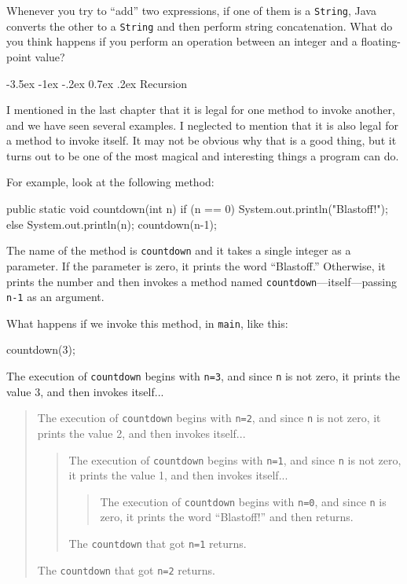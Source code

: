 \documentclass{book}
\makeatletter
\renewcommand{\section}{\@startsection 
    {section} {1} {0mm}%
    {-3.5ex \@plus -1ex \@minus -.2ex}%
    {0.7ex \@plus.2ex}%
    {\normalfont\Large\bfseries}}
\makeatother
\begin{document}
Whenever you try to ``add'' two
expressions, if one of them is a {\tt String}, Java converts the
other to a {\tt String} and then perform string concatenation.  What do you
think happens if you perform an operation between an integer and a
floating-point value?


\section{Recursion}
\label{recursion}

I mentioned in the last chapter that it is legal for one method to
invoke another, and we have seen several examples.  I neglected to
mention that it is also legal for a method to invoke itself.  It may
not be obvious why that is a good thing, but it turns out to be one of
the most magical and interesting things a program can do.

For example, look at the following method:

\begin{verbatimtab}
  public static void countdown(int n) {
    if (n == 0) {
      System.out.println("Blastoff!");
    } else {
      System.out.println(n);
      countdown(n-1);
    }
  }
\end{verbatimtab}
%
The name of the method is {\tt countdown} and it takes a single
integer as a parameter.  If the parameter is zero, it prints
the word ``Blastoff.''  Otherwise, it prints the number and
then invokes a method named {\tt countdown}---itself---passing
{\tt n-1} as an argument.

What happens if we invoke this method, in {\tt main}, like
this:

\begin{verbatimtab}
    countdown(3);
\end{verbatimtab}
%
The execution of {\tt countdown} begins with {\tt n=3}, and
since {\tt n} is not zero, it prints the value 3, and then
invokes itself...

\begin{quote}
The execution of {\tt countdown} begins with {\tt n=2}, and
since {\tt n} is not zero, it prints the value 2, and then
invokes itself...

\begin{quote}
The execution of {\tt countdown} begins with {\tt n=1}, and
since {\tt n} is not zero, it prints the value 1, and then
invokes itself...

\begin{quote}
The execution of {\tt countdown} begins with {\tt n=0}, and
since {\tt n} is zero, it prints the word ``Blastoff!''
and then returns.
\end{quote}

The {\tt countdown} that got {\tt n=1} returns.

\end{quote}

The {\tt countdown} that got {\tt n=2} returns.

\end{quote}
\end{document}
